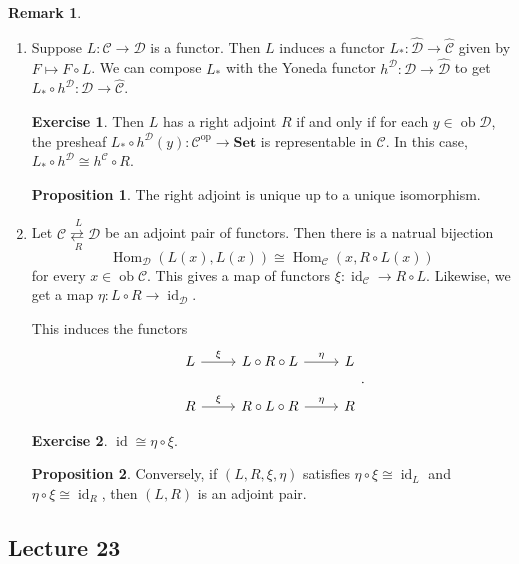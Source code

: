 \documentclass[10pt,letterpaper,cm]{nupset}
\theoremstyle{definition}
\newtheorem{remark}{Remark}
\newtheorem{prop}{Proposition}
\newtheorem{exercise}{Exercise}
\newcommand{\1}{\mathbf{1}}
\renewcommand{\c}{\mathscr{C}}
\renewcommand{\d}{\mathscr{D}}
\newcommand{\0}{\vec 0}
\DeclareMathOperator{\id}{id}
\DeclareMathOperator{\op}{op}
\DeclareMathOperator{\ob}{ob}
\DeclareMathOperator{\Hom}{Hom}
\begin{document}
\begin{remark} $ $
\begin{enumerate}
\item Suppose $L : \c \to \d$ is a functor. Then $L$ induces a functor $L_{\ast} : \widehat{\d} \to \widehat{\c}$ given by $F \mapsto F \circ L$. We can compose $L_{\ast}$ with the Yoneda functor $h^{\d} : \d \to \widehat{\d}$ to get $L_{\ast} \circ h^{\d} : \d \to \widehat{\c}$. 
\begin{exercise} Then $L$ has a right adjoint $R$  if and only if for each $y \in \ob \d$, the presheaf $L_{\ast} \circ h^{\d}(y) : \c^{\op} \to \mathbf{Set}$ is representable in $\c$. In this case, $L_{\ast} \circ h^{\d} \cong h^{\c} \circ R$.
\end{exercise}
\begin{prop}
The right adjoint is unique up to a unique isomorphism.
\end{prop}
\item Let $\overset{L}{\underset{R}{\c \rightleftarrows \d}}$ be an adjoint pair of functors. Then there is a natrual bijection $$\Hom_{\d}(L(x), L(x)) \cong \Hom_{\c}(x, R \circ L(x))$$ for every $x\in \ob \c$. This gives a map of functors $\xi : \id_{\c} \to R \circ L$. Likewise, we get a map $\eta : L \circ R \to \id_{\d}$.

This induces the functors 
\[
\begin{tikzcd}
L \arrow[r, "\xi"] & L \circ R \circ L \arrow[r, "\eta"] & L \\
R \arrow[r, "\xi"] & R\circ L \circ R \arrow[r, "\eta"] & R
\end{tikzcd}
.\]
\begin{exercise}
$\id \cong \eta \circ \xi$.
\end{exercise}
\begin{prop}
Conversely, if $(L, R, \xi, \eta)$ satisfies $\eta \circ \xi \cong \id_L$ and $\eta \circ \xi \cong \id_R$, then $(L, R)$ is an adjoint pair.
\end{prop}
\end{enumerate}
\end{remark}

\subsection{Lecture 23}
\end{document}
